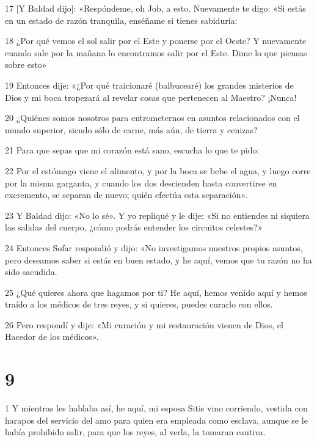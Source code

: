 \par 17 [Y Baldad dijo]: «Respóndeme, oh Job, a esto. Nuevamente te digo: «Si estás en un estado de razón tranquila, enséñame si tienes sabiduría:

\par 18 ¿Por qué vemos el sol salir por el Este y ponerse por el Oeste? Y nuevamente cuando sale por la mañana lo encontramos salir por el Este. Dime lo que piensas sobre esto»

\par 19 Entonces dije: «¿Por qué traicionaré (balbucearé) los grandes misterios de Dios y mi boca tropezará al revelar cosas que pertenecen al Maestro? ¡Nunca!

\par 20 ¿Quiénes somos nosotros para entrometernos en asuntos relacionados con el mundo superior, siendo sólo de carne, más aún, de tierra y cenizas?

\par 21 Para que sepas que mi corazón está sano, escucha lo que te pido:

\par 22 Por el estómago viene el alimento, y por la boca se bebe el agua, y luego corre por la misma garganta, y cuando los dos descienden hasta convertirse en excremento, se separan de nuevo; quién efectúa esta separación».

\par 23 Y Baldad dijo: «No lo sé». Y yo repliqué y le dije: «Si no entiendes ni siquiera las salidas del cuerpo, ¿cómo podrás entender los circuitos celestes?»

\par 24 Entonces Sofar respondió y dijo: «No investigamos nuestros propios asuntos, pero deseamos saber si estás en buen estado, y he aquí, vemos que tu razón no ha sido sacudida.

\par 25 ¿Qué quieres ahora que hagamos por ti? He aquí, hemos venido aquí y hemos traído a los médicos de tres reyes, y si quieres, puedes curarlo con ellos.

\par 26 Pero respondí y dije: «Mi curación y mi restauración vienen de Dios, el Hacedor de los médicos».

\chapter{9}

\par 1 Y mientras les hablaba así, he aquí, mi esposa Sitis vino corriendo, vestida con harapos del servicio del amo para quien era empleada como esclava, aunque se le había prohibido salir, para que los reyes, al verla, la tomaran cautiva.


